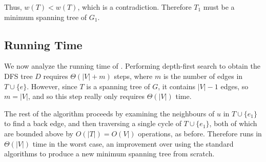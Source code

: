 \documentclass[10pt]{article}
\begin{document}
Thus, \(w(T) < w(T)\), which is a contradiction. Therefore \(T_1\) must be a minimum spanning tree of \(G_1\).

\subsection*{Running Time}

We now analyze the running time of . Performing depth-first search to obtain the DFS tree \(D\) requires \(\Theta(|V| + m)\) steps, where \(m\) is the number of edges in \(T \cup \{e\}\). However, since \(T\) is a spanning tree of \(G\), it contains \(|V| - 1\) edges, so \(m = |V|\), and so this step really only requires \(\Theta(|V|)\) time.

The rest of the algorithm proceeds by examining the neighbours of \(u\) in \(T \cup \{e_1\}\) to find a back edge, and then traversing a single cycle of \(T \cup \{e_1\}\), both of which are bounded above by \(O(|T|) = O(V|)\) operations, as before. Therefore  runs in \(\Theta(|V|)\) time in the worst case, an improvement over using the standard algorithms to produce a new minimum spanning tree from scratch.
\end{document}
